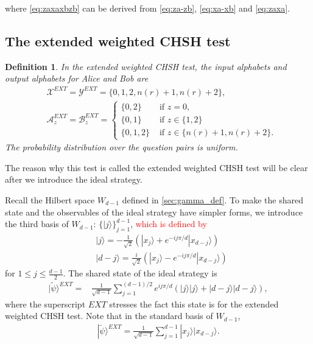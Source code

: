 \documentclass[11pt,letterpaper]{article}
\newcommand{\ket}[1]{|#1\rangle}
\newcommand{\calX}{\mathcal{X}}
\newcommand{\calY}{\mathcal{Y}}
\newcommand{\calA}{\mathcal{A}}
\newcommand{\calB}{\mathcal{B}}
\newcommand{\1}{\mathbb{1}}
\newcommand{\EXT}{EXT}
\newcommand{\tpsi}{\tilde{\psi}}
\newcommand{\nr}{n(r)}
\newcommand{\hf}[1]{\textcolor{red}{#1}}
\newtheorem{definition}[theorem]{Definition}
\theoremstyle{definition}
\begin{document}
where \cref{eq:zaxaxbzb} can be derived from \cref{eq:za-zb}, \cref{eq:xa-xb} and \cref{eq:zaxa}.

\subsection{The extended weighted CHSH test}
\label{sec:ext_w_chsh}
\begin{definition}
    \label{def:ext_w_chsh}
    In the extended weighted CHSH test, the input alphabets and output alphabets for Alice and Bob are
    \begin{align*}
        &\calX^{\EXT} = \calY^{\EXT} = \{0, 1, 2, \nr+1, \nr+2\}, \\
        &\calA_z^{\EXT} = \calB_z^{\EXT} =
        \begin{cases}
            \{0,2\} &\text{ if } z = 0, \\
            \{0,1\} &\text{ if } z \in \{1, 2\} \\
            \{0,1,2\} &\text{ if } z \in \{\nr+1, \nr+2\}. 
        \end{cases}
    \end{align*}
    The probability distribution over the question pairs is uniform.
\end{definition}
The reason why this test is called the extended weighted CHSH test will be clear 
after we introduce the ideal strategy.

Recall the Hilbert space $W_{d-1}$ defined in \cref{sec:gamma_def}. 
To make the shared state and the observables of the ideal strategy have
simpler forms, we introduce the third basis of $W_{d-1}$: $\{ \ket{j} \}_{j=1}^{d-1}$, \hf{which is defined by}
\begin{align*}
    &\ket{j} = -\frac{1}{\sqrt{2}}(\ket{x_j} + e^{-ij\pi/d}\ket{x_{d-j}}) \\
    &\ket{d-j} = \frac{i}{\sqrt{2}}(\ket{x_j} - e^{-ij\pi/d}\ket{x_{d-j}})
\end{align*}
for $1 \leq j \leq \frac{d-1}{2}$.
The shared state of the ideal strategy is 
\begin{equation}
    \label{eq:tpsi}
    \begin{aligned}
        \ket{\tpsi}^{\EXT}
         =& \frac{1}{\sqrt{d-1}} \sum_{j=1}^{(d-1)/2} e^{ij\pi/d}(\ket{j}\ket{j} + \ket{d-j}\ket{d-j}),
    \end{aligned}
\end{equation}
where the superscript $\EXT$ stresses the fact this state is for the extended weighted CHSH test.
Note that in the standard basis of $W_{d-1}$,
\begin{align*}
    \ket{\tpsi}^{\EXT} = \frac{1}{\sqrt{d-1}} \sum_{j=1}^{d-1} \ket{x_j}\ket{x_{d-j}}.
\end{align*}
\end{document}
